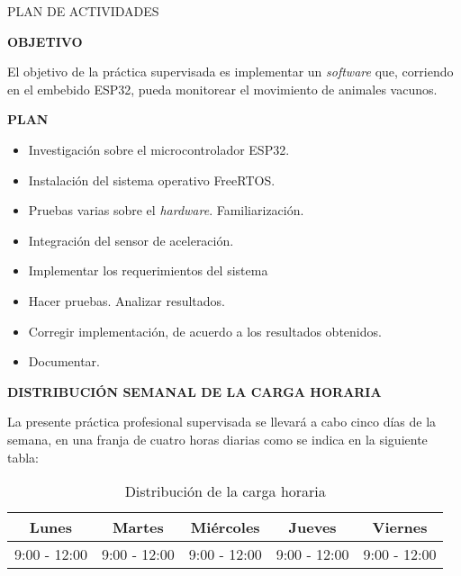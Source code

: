 \documentclass{article}
\begin{document}
    \begin{center}
        {\huge{PLAN DE ACTIVIDADES}}
    \end{center}

    \textbf{OBJETIVO} \par
    El objetivo de la práctica supervisada es implementar un \emph{software}
    que, corriendo en el embebido ESP32, pueda monitorear el movimiento de 
    animales vacunos. \newline

    \textbf{PLAN}
    \begin{itemize}
        \item Investigación sobre el microcontrolador ESP32.
        \item Instalación del sistema operativo FreeRTOS.
        \item Pruebas varias sobre el \emph{hardware}. Familiarización.
        \item Integración del sensor de aceleración.
        \item Implementar los requerimientos del sistema
        \item Hacer pruebas. Analizar resultados.
        \item Corregir implementación, de acuerdo a los resultados obtenidos.
        \item Documentar.
    \end{itemize} 

    \textbf{DISTRIBUCIÓN SEMANAL DE LA CARGA HORARIA} \par
    La presente práctica profesional supervisada se llevará a cabo cinco días
    de la semana, en una franja de cuatro horas diarias como se indica en la 
    siguiente tabla:
    
    \begin{table}[h]
        \centering
        \begin{tabular}{||c|c|c|c|c|} 
            \hline
            Lunes & Martes & Miércoles & Jueves & Viernes \\ [0.5ex] 
            \hline\hline
            9:00 - 12:00 & 9:00 - 12:00 & 9:00 - 12:00 & 9:00 - 12:00 & 9:00 - 12:00 \\
            \hline
        \end{tabular}
        \caption{Distribución de la carga horaria}
    \end{table}
\end{document}
